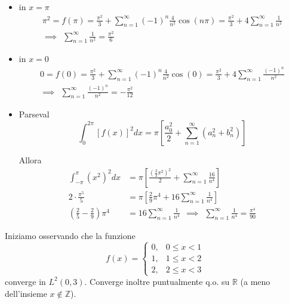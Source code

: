 \begin{itemize}
\item in $x=\pi $\begin{gather*}
\pi ^{2} =f( \pi ) =\frac{\pi ^{2}}{3} +\sum ^{\infty }_{n=1} (-1)^{n}\frac{4}{n^{2}}\cos (n\pi )=\frac{\pi ^{2}}{3} +4\sum ^{\infty }_{n=1}\frac{1}{n^{2}}\\
\implies \ \ \boxed{\sum ^{\infty }_{n=1}\frac{1}{n^{2}} =\frac{\pi ^{2}}{6}}
\end{gather*}
\item in $x=0$\begin{gather*}
0=f( 0) =\frac{\pi ^{2}}{3} +\sum ^{\infty }_{n=1} (-1)^{n}\frac{4}{n^{2}}\cos (0)=\frac{\pi ^{2}}{3} +4\sum ^{\infty }_{n=1}\frac{(-1)^{n}}{n^{2}}\\
\implies \ \ \boxed{\sum ^{\infty }_{n=1}\frac{(-1)^{n}}{n^{2}} =-\frac{\pi ^{2}}{12}}
\end{gather*}
\item Parseval\begin{equation*}
\int ^{2\pi }_{0}[ f(x)]^{2} dx=\pi \left[\frac{a^{2}_{0}}{2} +\sum ^{\infty }_{n=1} (a^{2}_{n} +b^{2}_{n} )\right]
\end{equation*}

Allora\begin{equation*}
\begin{aligned}
\int ^{\pi }_{-\pi }\left( x^{2}\right)^{2} dx & =\pi \left[\frac{\left(\frac{2}{3} \pi ^{2}\right)^{2}}{2} +\sum\limits ^{\infty }_{n=1}\frac{16}{n^{4}}\right]\\
2\cdotp \frac{\pi ^{5}}{5} & =\pi \left[\frac{2}{9} \pi ^{4} +16\sum\limits ^{\infty }_{n=1}\frac{1}{n^{4}}\right]\\
\left(\frac{2}{5} -\frac{2}{9}\right) \pi ^{4} & =16\sum\limits ^{\infty }_{n=1}\frac{1}{n^{4}} \ \ \implies \ \ \boxed{\sum\limits ^{\infty }_{n=1}\frac{1}{n^{4}} =\frac{\pi ^{4}}{90}}
\end{aligned}
\end{equation*}
\end{itemize}
\Soluzione

Iniziamo osservando che la funzione
\begin{equation*}
f(x)=\begin{cases}
0, & 0\leq x< 1\\
1, & 1\leq x< 2\\
2, & 2\leq x< 3
\end{cases}
\end{equation*}
converge in $L^{2}( 0,3)$. Converge inoltre puntualmente q.o. su $\mathbb{R}$ (a meno dell'insieme $x\notin \mathbb{Z}$).


